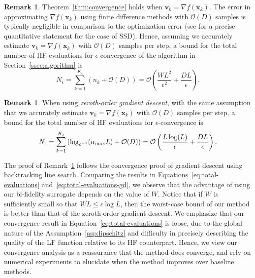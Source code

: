 \documentclass[10pt]{article} %
\numberwithin{equation}{section}
\theoremstyle{plain}
\theoremstyle{definition}
\newtheorem{remark}[theorem]{Remark}
\newcommand{\<}{\langle}
\renewcommand{\>}{\rangle}
\renewcommand{\(}{\left(}
\renewcommand{\)}{\right)}
\renewcommand{\[}{\left[}
\renewcommand{\]}{\right]}
\newcommand{\alphaMax}{\alpha_\textup{max}}
\newcommand{\Lip}{L}
\begin{document}
\begin{remark}
Theorem~\ref{thm:convergence} holds when $\bm v_k = \nabla f(\bm x_k)$. The error in approximating $\nabla f(\bm x_k)$ using finite difference methods with $\mathcal{O}(D)$ samples is typically negligible in comparison to the optimization error (see \citet{kozak2023zeroth} for a precise quantitative statement for the case of SSD). Hence, assuming we accurately estimate $\bm v_k = \nabla f(\bm x_k)$ with $\mathcal{O}(D)$ samples per step, a bound for the total number of HF evaluations for $\epsilon$-convergence of the algorithm in Section~\ref{ssec:algorithm} is
    \begin{equation}
    \label{eq:total-evaluations}
        N_\epsilon = \sum_{k=1}^{K_\epsilon} \left(n_k + \mathcal{O}(D)\right) = \mathcal{O}\left(\frac{W\Lip^2}{\epsilon^2} + \frac{D\Lip}{\epsilon}\right).
    \end{equation}
\end{remark}


\begin{remark}
\label{rmk:gd_N}
    When using \emph{zeroth-order gradient descent}, with the same assumption that we accurately estimate $\bm v_k = \nabla f(\bm x_k)$ with $\mathcal{O}(D)$ samples per step, a bound for the total number of HF evaluations for $\epsilon$-convergence is
    \begin{equation}
    \label{eq:total-evaluations-gd}
        N_\epsilon = \sum_{k=1}^{K_\epsilon} \left(\log_{c^{-1}}(\alphaMax\Lip) + \mathcal{O}(D)\right) = \mathcal{O}\left(\frac{\Lip\log(\Lip)}{\epsilon} + \frac{D\Lip}{\epsilon}\right).
    \end{equation}
\end{remark}

The proof of Remark~\ref{rmk:gd_N} follows the convergence proof of gradient descent using backtracking line search. Comparing the results in Equations~\eqref{eq:total-evaluations} and~\eqref{eq:total-evaluations-gd}, we observe that the advantage of using our bi-fidelity surrogate depends on the value of $W$. Notice that if $W$ is sufficiently small so that $W\Lip\leq \epsilon\log\Lip$, then the worst-case bound of our method is better than that of the zeroth-order gradient descent.
We emphasize that our convergence result in Equation~\eqref{eq:total-evaluations} is loose, due to the global nature of the Assumption~\ref{asp:lipschitz} and difficulty in precisely describing the quality of the LF function relative to its HF counterpart. Hence, we view our convergence analysis as a reassurance that the method does converge, and rely on numerical experiments to elucidate when the method improves over baseline methods.
\end{document}
